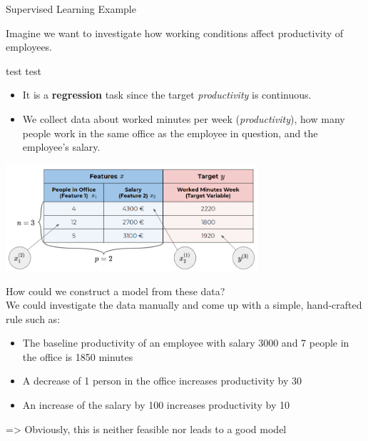 \begin{vbframe}{Supervised Learning Example}

Imagine we want to investigate how working conditions affect productivity of employees.

test test

\begin{itemize}
	\item It is a \textbf{regression} task since the target \emph{productivity} is continuous.
	\item We collect data about worked minutes
per week (\emph{productivity}), how many people work in the same office as the
employee in question, and the employee's salary.
\end{itemize}

\begin{center}
  \includegraphics[width = 0.7\textwidth]{figure_man/data_table}
\end{center}

\framebreak

How could we construct a model from these data?\\[1ex]

We could investigate the data manually and come up with a simple, hand-crafted rule such as:

	\begin{itemize}
		\item The baseline productivity of an employee with salary 3000 and 7 people in the office is 1850 minutes
		\item A decrease of 1 person in the office increases productivity by 30
		\item An increase of the salary by 100 increases productivity by 10
	\end{itemize}

=> Obviously, this is neither feasible nor leads to a good model
\end{vbframe}



